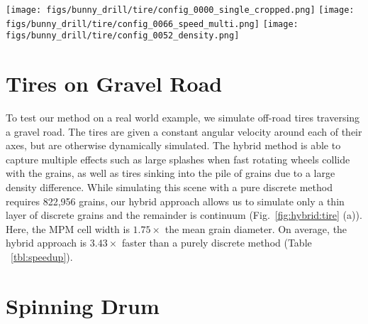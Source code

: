 \begin{figure*}
  \centering
  \texttt{[image: figs/bunny\_drill/tire/config\_0000\_single\_cropped.png]}
  \texttt{[image: figs/bunny\_drill/tire/config\_0066\_speed\_multi.png]}
  \texttt{[image: figs/bunny\_drill/tire/config\_0052\_density.png]}
  \caption{Simulations of tires traversing a bed of gravel. Left: A render of the initial condition (boundary condition not shown), with a tire poised to race across the bed of grains. Notice the layered hybridization employed here. Center: Tires with different angular velocities but equal densities. Left to right the tires rotate at 1000 rad/s, 100 rad/s, and 10 rad/s. The 1000 rad/s tire produces a large granular splash while the 10 rad/s tire produces almost no splash. Right: Tires of different densities, but with the same angular velocities. Left to right the tires have $5\times$, $2\times$, and $1\times$ the density of gravel. As the tires traverse the system, the larger density tires sink into the gravel.}
  \label{fig:hybrid:tire}
\end{figure*}

\section{Tires on Gravel Road}
To test our method on a real world example, we simulate off-road tires traversing a gravel road. The tires are given a constant angular velocity around each of their axes, but are otherwise dynamically simulated. The hybrid method is able to capture multiple effects such as large splashes when fast rotating wheels collide with the grains, as well as tires sinking into the pile of grains due to a large density difference. While simulating this scene with a pure discrete method requires 822,956 grains, our hybrid approach allows us to simulate only a thin layer of discrete grains and the remainder is continuum (Fig.~\ref{fig:hybrid:tire} (a)). Here, the MPM cell width is $1.75\times$ the mean grain diameter. On average, the hybrid approach is $3.43\times$ faster than a purely discrete method (Table ~\ref{tbl:speedup}).

\section{Spinning Drum}

